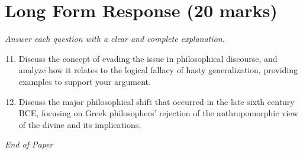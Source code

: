 \documentclass[12pt]{article}
\begin{document}
\section*{Long Form Response (20 marks)}
\textit{Answer each question with a clear and complete explanation.}
\begin{enumerate}[label=\arabic*.]
\setcounter{enumi}{10}
\item Discuss the concept of evading the issue in philosophical discourse, and analyze how it
relates to the logical fallacy of hasty generalization, providing examples to support your
argument.
\item Discuss the major philosophical shift that occurred in the late sixth century BCE,
focusing on Greek philosophers' rejection of the anthropomorphic view of the divine and
its implications.
\end{enumerate}

\vfill
\noindent\textit{End of Paper}
\end{document}
